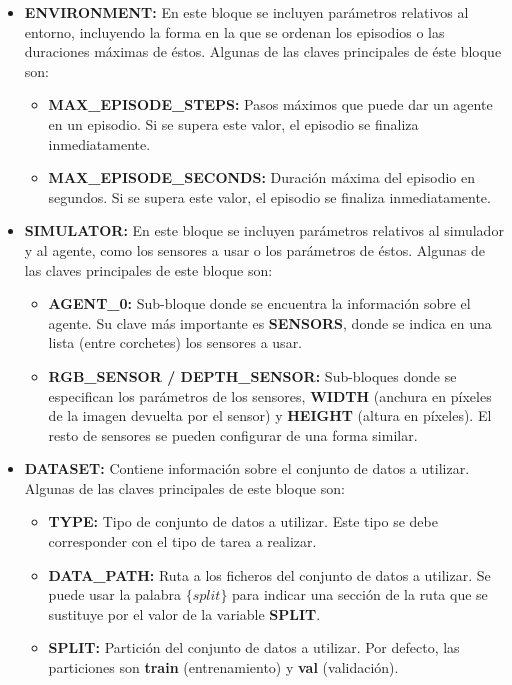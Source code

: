 \begin{itemize}
	\item \textbf{ENVIRONMENT:} En este bloque se incluyen parámetros relativos al entorno, incluyendo la forma en la que se ordenan los episodios o las duraciones máximas de éstos. Algunas de las claves principales de éste bloque son:
	
	\begin{itemize}
		\item \textbf{MAX{\_}EPISODE{\_}STEPS:} Pasos máximos que puede dar un agente en un episodio. Si se supera este valor, el episodio se finaliza inmediatamente.
		\item \textbf{MAX{\_}EPISODE{\_}SECONDS:} Duración máxima del episodio en segundos. Si se supera este valor, el episodio se finaliza inmediatamente.
	\end{itemize}
	
	\item \textbf{SIMULATOR:} En este bloque se incluyen parámetros relativos al simulador y al agente, como los sensores a usar o los parámetros de éstos. Algunas de las claves principales de este bloque son:
	
	\begin{itemize}
		\item \textbf{AGENT{\_}0:} Sub-bloque donde se encuentra la información sobre el agente. Su clave más importante es \textbf{SENSORS}, donde se indica en una lista (entre corchetes) los sensores a usar.
		\item \textbf{RGB{\_}SENSOR / DEPTH{\_}SENSOR:} Sub-bloques donde se especifican los parámetros de los sensores, \textbf{WIDTH} (anchura en píxeles de la imagen devuelta por el sensor) y \textbf{HEIGHT} (altura en píxeles). El resto de sensores se pueden configurar de una forma similar.
	\end{itemize}
	
	\item \textbf{DATASET:} Contiene información sobre el conjunto de datos a utilizar. Algunas de las claves principales de este bloque son:
	\begin{itemize}
		\item \textbf{TYPE:} Tipo de conjunto de datos a utilizar. Este tipo se debe corresponder con el tipo de tarea a realizar.
		\item \textbf{DATA{\_}PATH:} Ruta a los ficheros del conjunto de datos a utilizar. Se puede usar la palabra $\{split\}$ para indicar una sección de la ruta que se sustituye por el valor de la variable \textbf{SPLIT}.
		\item \textbf{SPLIT:} Partición del conjunto de datos a utilizar. Por defecto, las particiones son \textbf{train} (entrenamiento) y \textbf{val} (validación).
	\end{itemize}
	

\end{itemize}
